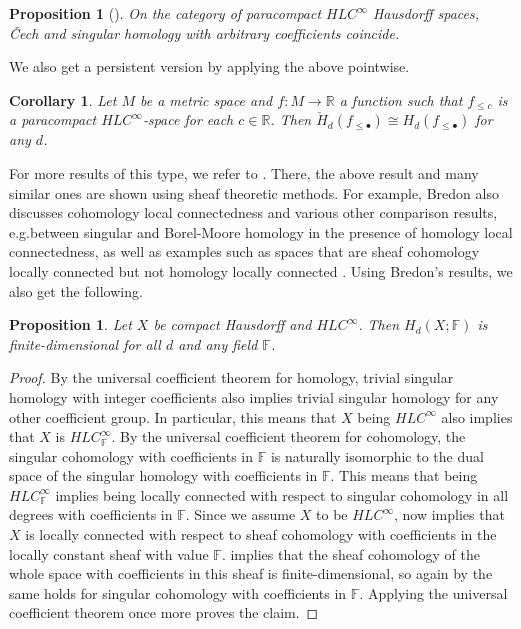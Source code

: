 \documentclass{amsart}
\theoremstyle{plain}
\newtheorem{cor}[thm]{Corollary}
\newtheorem{prop}[thm]{Proposition}
\theoremstyle{definition}
\newcommand\CH{\check{H}}
\begin{document}
\begin{prop}[{\cite{MR105677, MR1481706}}]\label{prop:cech_sing_hom_hlc}
On the category of paracompact $HLC^{\infty}$ Hausdorff spaces, \v{C}ech and singular homology with arbitrary coefficients coincide.
\end{prop}

We also get a persistent version by applying the above pointwise.

\begin{cor}\label{cor:cech_sing_persistent_iso}
Let $M$ be a metric space and $f\colon M\to\mathbb{R}$ a function such that $f_{\leq c}$ is a paracompact $HLC^\infty$-space for each $c\in\mathbb{R}$. Then $\CH_d(f_{\leq\bullet})\cong H_d(f_{\leq\bullet})$ for any $d$.
\end{cor}

For more results of this type, we refer to \cite{MR1481706}. There, the above result \cite[Corollary VI.12.6]{MR1481706} and many similar ones are shown using sheaf theoretic methods. For example, Bredon also discusses cohomology local connectedness \cite[Section II.17]{MR1481706} and various other comparison results, e.g.\@ between singular and Borel-Moore homology \cite[Corollary V.12.15]{MR1481706} in the presence of homology local connectedness, as well as examples such as spaces that are sheaf cohomology locally connected but not homology locally connected \cite[Example II.17.12]{MR1481706}. Using Bredon's results, we also get the following.

\begin{prop}\label{prop:fin_dim_sing_hom}
Let $X$ be compact Hausdorff and $HLC^{\infty}$. Then $H_d(X;\mathbb{F})$ is finite-dimensional for all $d$ and any field $\mathbb{F}$.
\end{prop}
\begin{proof}
By the universal coefficient theorem for homology, trivial singular homology with integer coefficients also implies trivial singular homology for any other coefficient group. In particular, this means that $X$ being $HLC^{\infty}$ also implies that $X$ is $HLC^{\infty}_{\mathbb{F}}$. By the universal coefficient theorem for cohomology, the singular cohomology with coefficients in $\mathbb{F}$ is naturally isomorphic to the dual space of the singular homology with coefficients in $\mathbb{F}$. This means that being $HLC^{\infty}_{\mathbb{F}}$ implies being locally connected with respect to singular cohomology in all degrees with coefficients in $\mathbb{F}$. Since we assume $X$ to be $HLC^{\infty}$, \cite[Theorem III.1.1]{MR1481706} now implies that $X$ is locally connected with respect to sheaf cohomology with coefficients in the locally constant sheaf with value $\mathbb{F}$. \cite[Corollary II.17.7]{MR1481706} implies that the sheaf cohomology of the whole space with coefficients in this sheaf is finite-dimensional, so again by \cite[Theorem III.1.1]{MR1481706} the same holds for singular cohomology with coefficients in $\mathbb{F}$. Applying the universal coefficient theorem once more proves the claim.
\end{proof}
\end{document}
